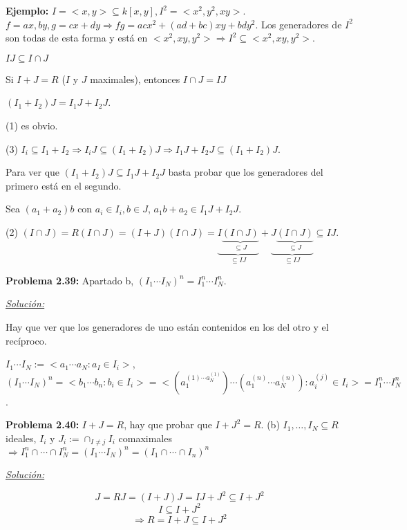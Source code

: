 \textbf{Ejemplo:} $I=<x,y>\subseteq k[x,y], I^2=<x^2,y^2,xy>$.
\framebox{$\subseteq $} $f=ax,by,g=cx+dy \Rightarrow fg = acx^2+(ad+bc)xy+bdy^2$. Los generadores de $I^2$ son todas de esta forma y está en $<x^2,xy,y^2> \Rightarrow I^2\subseteq <x^2,xy,y^2>$. 

\begin{Lem}
\begin{itemize*}
\item $IJ\subseteq I\cap J$
\item Si $I+J=R$ ($I$ y $J$ maximales), entonces $I\cap J=IJ$
\item $(I_1+I_2)J=I_1J+I_2J$. 
\end{itemize*}
\end{Lem}

\begin{Dem}
(1) es obvio.

(3) $I_i\subseteq I_1+I_2 \Rightarrow I_iJ\subseteq (I_1+I_2)J\Rightarrow I_1J+I_2J\subseteq (I_1+I_2)J$.

Para ver que $(I_1+I_2)J\subseteq I_1J+I_2J$ basta probar que los generadores del primero está en el segundo. 

Sea $(a_1+a_2)b$ con $a_i\in I_i,b\in J$, $a_1b+a_2 \in I_1J+I_2J$.

(2) $(I\cap J)=R(I\cap J)=(I+J)(I\cap J)=\underbrace{I\underbrace{(I\cap J)}_{\subseteq J}}_{\subseteq IJ}+\underbrace{J\underbrace{(I\cap J)}_{\subseteq J}}_{\subseteq IJ}\subseteq IJ$.
\end{Dem}

\textbf{Problema 2.39: } Apartado b, $(I_1\cdots I_N)^n=I_1^n\cdots I_N^n$. 

\underline{\textit{Solución:}}

Hay que ver que los generadores de uno están contenidos en los del otro y el recíproco. 

$I_1\cdots I_N := <a_1\cdots a_N : a_I \in I_i >$, $(I_1\cdots I_N)^n=<b_1\cdots b_n : b_i \in  I_i >=<(a_1^{(1)\cdots a_N^{(1)}})\cdots (a_1^{(n)}\cdots a_N^{(n)}) : a_i^{(j)}\in I_i>=I_1^n\cdots I_N^n$. 

\textbf{Problema 2.40:} $I+J=R$, hay que probar que $I+J^2=R$. (b) $I_1,\dots, I_N\subseteq R$ ideales, $I_i$ y $J_i:= \cap_{I\neq j} I_i$ comaximales $\Rightarrow I_1^n\cap \cdots \cap I_N^n=(I_1\cdots I_N)^n=(I_1\cap \cdots \cap I_n)^n$

\underline{\textit{Solución:}}

$$J=RJ=(I+J)J=IJ +J^2\subseteq I+J^2$$
$$ I\subseteq  I+J^2$$
$$\Rightarrow R=I+J\subseteq I+J^2 $$

